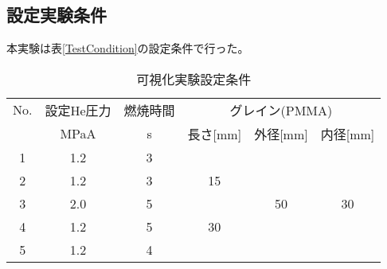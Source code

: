 \subsection{設定実験条件}
本実験は表\ref{TestCondition}の設定条件で行った。

\begin{table}[htb]
\begin{center}
\caption{可視化実験設定条件}
\small
\begin{tabular}{|c|c|c|c|c|c|} \hline
No. & 設定He圧力 & 燃焼時間 & \multicolumn{3}{|c|}{グレイン(PMMA)} \\ \cline{2-6}
 & MPaA & s & 長さ[mm] & 外径[mm] & 内径[mm]  \\ \hline
1 & 1.2 & 3 & & & \\ \cline{1-3}
2 & 1.2 & 3 & 15 & & \\ \cline{1-3}
3 & 2.0 & 5 & & 50 & 30  \\ \cline{1-4}
4 & 1.2 & 5 &30  &  & \\ \cline{1-3}
5 & 1.2 & 4 &  &  &  \\ \hline
\end{tabular}
\label{tab:TestCondition}
\end{center}
\end{table}

